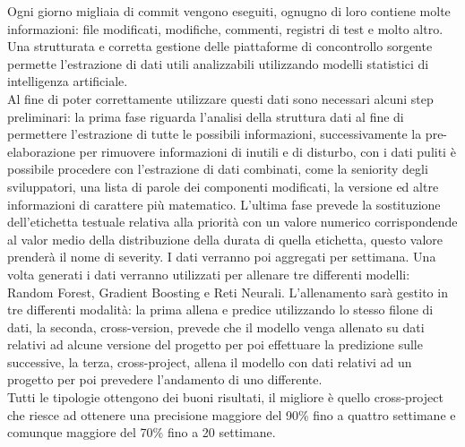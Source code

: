 \documentclass[%
    corpo=12pt,
    twoside,
    oldstyle,
    autoretitolo,
    greek,
    evenboxes,
]{toptesi}
\begin{document}


%

\renewcommand*\IDlabel{}
%







\frontespizio
\summary
Ogni giorno migliaia di commit vengono eseguiti, ognugno di loro contiene molte informazioni: file modificati, modifiche, commenti, registri di test e molto altro. Una strutturata e corretta gestione delle piattaforme di concontrollo sorgente permette l'estrazione di dati utili analizzabili utilizzando modelli statistici di intelligenza artificiale.\\
Al fine di poter correttamente utilizzare questi dati sono necessari alcuni step preliminari: la prima fase riguarda l'analisi della struttura dati al fine di permettere l'estrazione di tutte le possibili informazioni, successivamente la pre-elaborazione per rimuovere informazioni di inutili e di disturbo, con i dati puliti è possibile procedere con l'estrazione di dati combinati, come la seniority degli sviluppatori, una lista di parole dei componenti modificati, la versione ed altre informazioni di carattere più matematico. L'ultima fase prevede la sostituzione dell'etichetta testuale relativa alla priorità con un valore numerico corrispondende al valor medio della distribuzione della durata di quella etichetta, questo valore prenderà il nome di severity. I dati verranno poi aggregati per settimana.
Una volta generati i dati verranno utilizzati per allenare tre differenti modelli: Random Forest, Gradient Boosting e Reti Neurali. L'allenamento sarà gestito in tre differenti modalità: la prima allena e predice utilizzando lo stesso filone di dati, la seconda, cross-version, prevede che il modello venga allenato su dati relativi ad alcune versione del progetto per poi effettuare la predizione sulle successive, la terza, cross-project, allena il modello con dati relativi ad un progetto per poi prevedere l'andamento di uno differente.\\
Tutti le tipologie ottengono dei buoni risultati, il migliore è quello cross-project che riesce ad ottenere una precisione maggiore del 90\% fino a quattro settimane e comunque maggiore del 70\% fino a 20 settimane.
\end{document}

